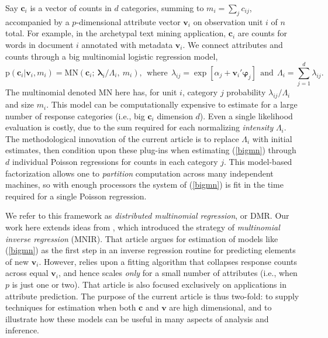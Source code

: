 \documentclass[12pt]{article}
\newcommand{\bs}[1]{\boldsymbol{#1}}
\newcommand{\mr}[1]{\mathrm{#1}}
\newcommand{\bm}[1]{\mathbf{#1}}
\begin{document}
Say $\bm{c}_i$ is a vector of counts in $d$ categories, summing to $m_i =
\sum_j c_{ij}$, accompanied by a $p$-dimensional attribute vector $\bm{v}_i$ on observation
unit $i$ of $n$ total.  For example, in the archetypal text mining application, $\bm{c}_i$
are counts for words in document $i$ annotated with metadata $\bm{v}_i$.   We
connect attributes and counts through a big multinomial logistic regression
model,
\begin{equation}\label{bigmn}
\mr{p}(\bm{c}_{i} | \bm{v}_i,m_i) = 
\mr{MN}\left(\bm{c}_i;~\bs{\lambda}_{i}/\Lambda_i,
~m_i\right),~~\text{where}~~\lambda_{ij} = \exp[\alpha_j + \bm{v}_i'\bs{\varphi}_j]~~\text{and}~~\Lambda_i = \sum_{j=1}^d\lambda_{ij}.
 \end{equation} 
 The multinomial denoted $\mr{MN}$ here has, for unit $i$, category $j$ probability
$\lambda_{ij}/\Lambda_i$ and size $m_i$. This model can be computationally
expensive to estimate for a large number of response categories (i.e., big
$\bm{c}_i$ dimension $d$).  Even a single likelihood evaluation is costly, due
to the sum required for each normalizing {\it intensity} $\Lambda_i$. The
methodological innovation of the current article is to replace $\Lambda_i$
with initial estimates, then condition upon these plug-ins when estimating
(\ref{bigmn}) through $d$ individual Poisson regressions for counts in each
category $j$. This model-based factorization allows one to {\it partition}
computation across many independent machines, so with enough processors the
system of (\ref{bigmn}) is fit in the time required for a single Poisson
regression.

We refer to this framework as {\it distributed multinomial regression}, or DMR.
Our work here extends ideas from \cite{taddy_multinomial_2013}, which
introduced the strategy of {\it multinomial inverse regression} (MNIR).  That
article argues for estimation of models like (\ref{bigmn}) as the first step
in an inverse regression routine for predicting elements of new $\bm{v}_i$.
However, \cite{taddy_multinomial_2013} relies upon a fitting algorithm that
collapses response counts across equal $\bm{v}_i$, and hence scales {\it only}
for a small number of attributes (i.e., when $p$ is just one or two). That
article is also focused exclusively on applications in attribute prediction.
The purpose of the current article is thus two-fold: to supply techniques for
estimation when both $\bm{c}$ and $\bm{v}$ are high dimensional, and to
illustrate how these models can be useful in many aspects of analysis and
inference.
\end{document}
